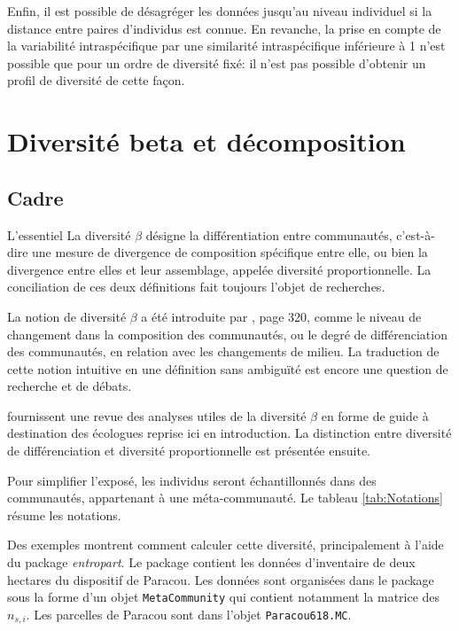 \documentclass[
  11pt,
  french,
  a4paper,
  extrafontsizes,onecolumn,openright
  ]{memoir}
\newenvironment{Summary}
  {\begin{bclogo}[logo=\bctrombone, noborder=true, couleur=lightgray!50]{L'essentiel}\parindent0pt}
  {\end{bclogo}}
\begin{document}
Enfin, il est possible de désagréger les données jusqu'au niveau individuel si la distance entre paires d'individus est connue.
En revanche, la prise en compte de la variabilité intraspécifique par une similarité intraspécifique inférieure à 1 n'est possible que pour un ordre de diversité fixé: il n'est pas possible d'obtenir un profil de diversité de cette façon.

\hypertarget{part-diversituxe9-beta-et-duxe9composition}{%
\part{Diversité beta et décomposition}\label{part-diversituxe9-beta-et-duxe9composition}}

\hypertarget{sec-betaCadre}{%
\chapter{Cadre}\label{sec-betaCadre}}

\scriptsize

\begin{Summary}
La diversité \(\beta\) désigne la différentiation entre communautés,
c'est-à-dire une mesure de divergence de composition spécifique entre
elle, ou bien la divergence entre elles et leur assemblage, appelée
diversité proportionnelle. La conciliation de ces deux définitions fait
toujours l'objet de recherches.
\end{Summary}

\normalsize

La notion de diversité \(\beta\) a été introduite par \textcite{Whittaker1960}, page 320, comme le niveau de changement dans la composition des communautés, ou le degré de différenciation des communautés, en relation avec les changements de milieu.
La traduction de cette notion intuitive en une définition sans ambiguïté est encore une question de recherche et de débats.

\textcite{Anderson2011} fournissent une revue des analyses utiles de la diversité \(\beta\) en forme de guide à destination des écologues reprise ici en introduction.
La distinction entre diversité de différenciation et diversité proportionnelle est présentée ensuite.

Pour simplifier l'exposé, les individus seront échantillonnés dans des communautés, appartenant à une méta-communauté.
Le tableau \ref{tab:Notations} résume les notations.

Des exemples montrent comment calculer cette diversité, principalement à l'aide du package \emph{entropart}.
Le package contient les données d'inventaire de deux hectares du dispositif de Paracou.
Les données sont organisées dans le package sous la forme d'un objet \texttt{MetaCommunity} qui contient notamment la matrice des \(n_{s,i}\).
Les parcelles de Paracou sont dans l'objet \texttt{Paracou618.MC}.
\end{document}
